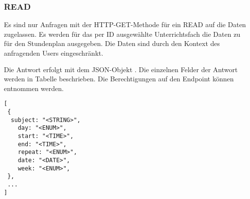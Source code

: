 \subsubsection{READ}
\label{secrest:api:subjects:id:timetable:read}
Es sind nur Anfragen mit der HTTP-GET-Methode für ein READ auf die Daten zugelassen.
Es werden für das per ID ausgewählte Unterrichtsfach die Daten zu für den Stundenplan ausgegeben.
Die Daten sind durch den Kontext des anfragenden Users eingeschränkt.

Die Antwort erfolgt mit dem JSON-Objekt . 
Die einzelnen Felder der Antwort werden in Tabelle  beschrieben.
Die Berechtigungen auf den Endpoint können  entnommen werden.

\begin{lstlisting}[caption={JSON-Antwort für einen GET-Aufruf der Route /api/subjects/\$id/timetable},label={lst:code:rest:api:subjects:id:timetable:read:ret},frame=tlrb]
[
 {
  subject: "<STRING>",
	day: "<ENUM>",
	start: "<TIME>",
	end: "<TIME>",
	repeat: "<ENUM>",
	date: "<DATE>",
	week: "<ENUM>",
 },
 ...
]
\end{lstlisting}
